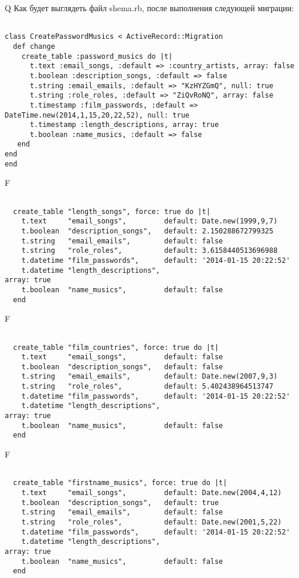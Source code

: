 Q
Как будет выглядеть файл shema.rb, после выполнения следующей миграции:

\begin{verbatim}

class CreatePasswordMusics < ActiveRecord::Migration 
  def change 
    create_table :password_musics do |t| 
      t.text :email_songs, :default => :country_artists, array: false
      t.boolean :description_songs, :default => false
      t.string :email_emails, :default => "KzHYZGmQ", null: true
      t.string :role_roles, :default => "ZiQvRoNQ", array: false
      t.timestamp :film_passwords, :default => DateTime.new(2014,1,15,20,22,52), null: true
      t.timestamp :length_descriptions, array: true
      t.boolean :name_musics, :default => false
   end
end
end
\end{verbatim}

F
\begin{verbatim}

  create_table "length_songs", force: true do |t|
    t.text     "email_songs",         default: Date.new(1999,9,7)
    t.boolean  "description_songs",   default: 2.150288672799325
    t.string   "email_emails",        default: false
    t.string   "role_roles",          default: 3.6158440513696988
    t.datetime "film_passwords",      default: '2014-01-15 20:22:52'
    t.datetime "length_descriptions",                                 array: true
    t.boolean  "name_musics",         default: false
  end

\end{verbatim}

F
\begin{verbatim}

  create_table "film_countries", force: true do |t|
    t.text     "email_songs",         default: false
    t.boolean  "description_songs",   default: false
    t.string   "email_emails",        default: Date.new(2007,9,3)
    t.string   "role_roles",          default: 5.402438964513747
    t.datetime "film_passwords",      default: '2014-01-15 20:22:52'
    t.datetime "length_descriptions",                                 array: true
    t.boolean  "name_musics",         default: false
  end

\end{verbatim}

F
\begin{verbatim}

  create_table "firstname_musics", force: true do |t|
    t.text     "email_songs",         default: Date.new(2004,4,12)
    t.boolean  "description_songs",   default: true
    t.string   "email_emails",        default: false
    t.string   "role_roles",          default: Date.new(2001,5,22)
    t.datetime "film_passwords",      default: '2014-01-15 20:22:52'
    t.datetime "length_descriptions",                                 array: true
    t.boolean  "name_musics",         default: false
  end

\end{verbatim}

